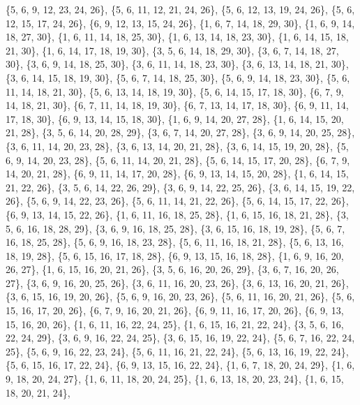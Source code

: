 \documentclass[11pt,a4paper]{article}
\begin{document}
{\{5, 6, 9, 12, 23, 24, 26\}, \{5, 6, 11, 12, 21, 24, 26\}, \{5, 6, 12, 13, 19, 24, 26\}, \{5, 6, 12, 15, 17, 24, 26\}, \{6, 9, 12, 13, 15, 24, 26\},
\{1, 6, 7, 14, 18, 29, 30\}, \{1, 6, 9, 14, 18, 27, 30\}, \{1, 6, 11, 14, 18, 25, 30\}, \{1, 6, 13, 14, 18, 23, 30\}, \{1, 6, 14, 15, 18, 21, 30\},
\{1, 6, 14, 17, 18, 19, 30\}, \{3, 5, 6, 14, 18, 29, 30\}, \{3, 6, 7, 14, 18, 27, 30\}, \{3, 6, 9, 14, 18, 25, 30\}, \{3, 6, 11, 14, 18, 23, 30\},
\{3, 6, 13, 14, 18, 21, 30\}, \{3, 6, 14, 15, 18, 19, 30\}, \{5, 6, 7, 14, 18, 25, 30\}, \{5, 6, 9, 14, 18, 23, 30\}, \{5, 6, 11, 14, 18, 21, 30\},
\{5, 6, 13, 14, 18, 19, 30\}, \{5, 6, 14, 15, 17, 18, 30\}, \{6, 7, 9, 14, 18, 21, 30\}, \{6, 7, 11, 14, 18, 19, 30\}, \{6, 7, 13, 14, 17, 18, 30\},
\{6, 9, 11, 14, 17, 18, 30\}, \{6, 9, 13, 14, 15, 18, 30\}, \{1, 6, 9, 14, 20, 27, 28\}, \{1, 6, 14, 15, 20, 21, 28\}, \{3, 5, 6, 14, 20, 28, 29\},
\{3, 6, 7, 14, 20, 27, 28\}, \{3, 6, 9, 14, 20, 25, 28\}, \{3, 6, 11, 14, 20, 23, 28\}, \{3, 6, 13, 14, 20, 21, 28\}, \{3, 6, 14, 15, 19, 20, 28\},
\{5, 6, 9, 14, 20, 23, 28\}, \{5, 6, 11, 14, 20, 21, 28\}, \{5, 6, 14, 15, 17, 20, 28\}, \{6, 7, 9, 14, 20, 21, 28\}, \{6, 9, 11, 14, 17, 20, 28\},
\{6, 9, 13, 14, 15, 20, 28\}, \{1, 6, 14, 15, 21, 22, 26\}, \{3, 5, 6, 14, 22, 26, 29\}, \{3, 6, 9, 14, 22, 25, 26\}, \{3, 6, 14, 15, 19, 22, 26\},
\{5, 6, 9, 14, 22, 23, 26\}, \{5, 6, 11, 14, 21, 22, 26\}, \{5, 6, 14, 15, 17, 22, 26\}, \{6, 9, 13, 14, 15, 22, 26\}, \{1, 6, 11, 16, 18, 25, 28\},
\{1, 6, 15, 16, 18, 21, 28\}, \{3, 5, 6, 16, 18, 28, 29\}, \{3, 6, 9, 16, 18, 25, 28\}, \{3, 6, 15, 16, 18, 19, 28\}, \{5, 6, 7, 16, 18, 25, 28\},
\{5, 6, 9, 16, 18, 23, 28\}, \{5, 6, 11, 16, 18, 21, 28\}, \{5, 6, 13, 16, 18, 19, 28\}, \{5, 6, 15, 16, 17, 18, 28\}, \{6, 9, 13, 15, 16, 18, 28\},
\{1, 6, 9, 16, 20, 26, 27\}, \{1, 6, 15, 16, 20, 21, 26\}, \{3, 5, 6, 16, 20, 26, 29\}, \{3, 6, 7, 16, 20, 26, 27\}, \{3, 6, 9, 16, 20, 25, 26\},
\{3, 6, 11, 16, 20, 23, 26\}, \{3, 6, 13, 16, 20, 21, 26\}, \{3, 6, 15, 16, 19, 20, 26\}, \{5, 6, 9, 16, 20, 23, 26\}, \{5, 6, 11, 16, 20, 21, 26\},
\{5, 6, 15, 16, 17, 20, 26\}, \{6, 7, 9, 16, 20, 21, 26\}, \{6, 9, 11, 16, 17, 20, 26\}, \{6, 9, 13, 15, 16, 20, 26\}, \{1, 6, 11, 16, 22, 24, 25\},
\{1, 6, 15, 16, 21, 22, 24\}, \{3, 5, 6, 16, 22, 24, 29\}, \{3, 6, 9, 16, 22, 24, 25\}, \{3, 6, 15, 16, 19, 22, 24\}, \{5, 6, 7, 16, 22, 24, 25\},
\{5, 6, 9, 16, 22, 23, 24\}, \{5, 6, 11, 16, 21, 22, 24\}, \{5, 6, 13, 16, 19, 22, 24\}, \{5, 6, 15, 16, 17, 22, 24\}, \{6, 9, 13, 15, 16, 22, 24\},
\{1, 6, 7, 18, 20, 24, 29\}, \{1, 6, 9, 18, 20, 24, 27\}, \{1, 6, 11, 18, 20, 24, 25\}, \{1, 6, 13, 18, 20, 23, 24\}, \{1, 6, 15, 18, 20, 21, 24\},
}
\end{document}
